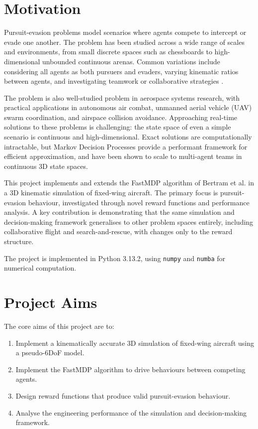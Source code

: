 \label{sec:1}

\section{Motivation}
\label{sec:1.1}
Pursuit-evasion problems model scenarios where agents compete to intercept or evade one another. The problem has been studied across a wide range of scales and environments, from small discrete spaces such as chessboards to high-dimensional unbounded continuous arenas. Common variations include considering all agents as both pursuers and evaders, varying kinematic ratios between agents, and investigating teamwork or collaborative strategies \cite{weintraub2020}.

The problem is also well-studied problem in aerospace systems research, with practical applications in autonomous air combat, unmanned aerial vehicle (UAV) swarm coordination, and airspace collision avoidance. Approaching real-time solutions to these problems is challenging: the state space of even a simple scenario is continuous and high-dimensional. Exact solutions are computationally intractable\cite{mcgrew2010}, but Markov Decision Processes provide a performant framework for efficient approximation\cite{bertram2d}, and have been shown to scale to multi-agent teams in continuous 3D state spaces\cite{bertram3d}.

This project implements and extends the FastMDP algorithm of Bertram et al.\cite{bertram2d} in a 3D kinematic simulation of fixed-wing aircraft. The primary focus is pursuit-evasion behaviour, investigated through novel reward functions and performance analysis. A key contribution is demonstrating that the same simulation and decision-making framework generalises to other problem spaces entirely, including collaborative flight and search-and-rescue, with changes only to the reward structure.

The project is implemented in Python 3.13.2, using \texttt{numpy} and \texttt{numba} for numerical computation.

\section{Project Aims}
\label{sec:1.2}
The core aims of this project are to:
\begin{enumerate}[noitemsep]
    \item Implement a kinematically accurate 3D simulation of fixed-wing aircraft using a pseudo-6DoF model.
    \item Implement the FastMDP algorithm to drive behaviours between competing agents.
    \item Design reward functions that produce valid pursuit-evasion behaviour.
    \item Analyse the engineering performance of the simulation and decision-making framework.
\end{enumerate}

